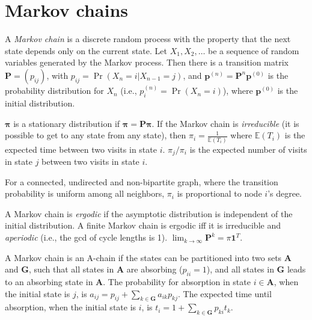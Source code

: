 \section{Markov chains}
A \emph{Markov chain} is a discrete random process with the property that the next state depends only on the current state.
Let $X_1,X_2,\ldots$ be a sequence of random variables generated by the Markov process.
Then there is a transition matrix $\mathbf{P} = (p_{ij})$, with $p_{ij} = \Pr(X_n = i | X_{n-1} = j)$,
and $\mathbf{p}^{(n)} = \mathbf P^n \mathbf p^{(0)}$ is the probability distribution for $X_n$ (i.e., $p^{(n)}_i = \Pr(X_n = i)$),
where $\mathbf{p}^{(0)}$ is the initial distribution.

$\mathbf{\pi}$ is a stationary distribution if $\mathbf{\pi} = \mathbf{P\pi}$.
If the Markov chain is \emph{irreducible} (it is possible to get to any state from any state),
then $\pi_i = \frac{1}{\mathbb{E}(T_i)}$ where $\mathbb{E}(T_i)$  is the expected time between two visits in state $i$.
$\pi_j/\pi_i$ is the expected number of visits in state $j$ between two visits in state $i$.

For a connected, undirected and non-bipartite graph, where the transition probability is uniform among all neighbors, $\pi_i$ is proportional to node $i$'s degree.

A Markov chain is \emph{ergodic} if the asymptotic distribution is independent of the initial distribution.
A finite Markov chain is ergodic iff it is irreducible and \emph{aperiodic} (i.e., the gcd of cycle lengths is 1).
$\lim_{k\rightarrow\infty}\mathbf{P}^k = \pi\mathbf{1}^T$.

A Markov chain is an A-chain if the states can be partitioned into two sets $\mathbf{A}$ and $\mathbf{G}$, such that all states in $\mathbf{A}$ are absorbing ($p_{ii}=1$), and all states in $\mathbf{G}$ leads to an absorbing state in $\mathbf{A}$.
The probability for absorption in state $i\in\mathbf{A}$, when the initial state is $j$, is $a_{ij} = p_{ij}+\sum_{k\in\mathbf{G}} a_{ik}p_{kj}$.
The expected time until absorption, when the initial state is $i$, is $t_i = 1+\sum_{k\in\mathbf{G}}p_{ki}t_k$.

